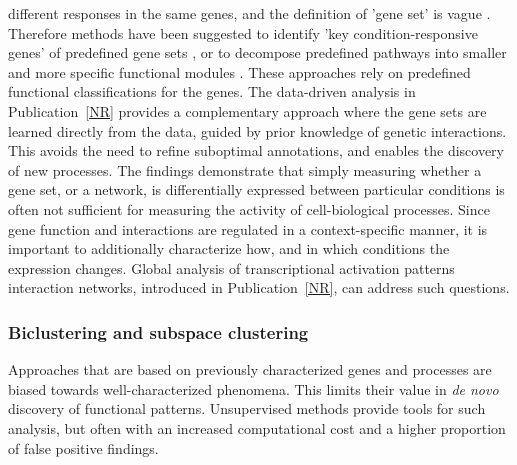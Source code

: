 different responses in the same genes, and the definition of 'gene
set' is vague \citep{Montaner09, Nacu07}. Therefore methods have been
suggested to identify 'key condition-responsive genes' of predefined
gene sets \citep{Lee08c}, or to decompose predefined pathways into
smaller and more specific functional modules \citep{Chang09}. These
approaches rely on predefined functional classifications for the
genes. The data-driven analysis in Publication~\ref{NR} provides a
complementary approach where the gene sets are learned directly from
the data, guided by prior knowledge of genetic interactions. This
avoids the need to refine suboptimal annotations, and enables the
discovery of new processes. The findings demonstrate that simply
measuring whether a gene set, or a network, is differentially
expressed between particular conditions is often not sufficient for
measuring the activity of cell-biological processes. Since gene
function and interactions are regulated in a context-specific manner,
it is important to additionally characterize how, and in which
conditions the expression changes. Global analysis of transcriptional
activation patterns interaction networks, introduced in
Publication~\ref{NR}, can address such questions.


\subsubsection{Biclustering and subspace clustering}

Approaches that are based on previously characterized genes and
processes are biased towards well-characterized phenomena. This limits
their value in {\it de novo} discovery of functional patterns.
Unsupervised methods provide tools for such analysis, but often with
an increased computational cost and a higher proportion of false
positive findings.

